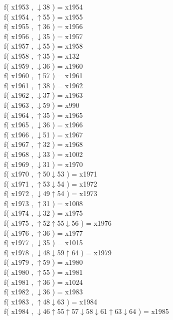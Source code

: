 f( x1953 , $\downarrow$38 ) = x1954 \\
f( x1954 , $\uparrow$55 ) = x1955 \\
f( x1955 , $\uparrow$36 ) = x1956 \\
f( x1956 , $\downarrow$35 ) = x1957 \\
f( x1957 , $\downarrow$55 ) = x1958 \\
f( x1958 , $\uparrow$35 ) = x132 \\
f( x1959 , $\downarrow$36 ) = x1960 \\
f( x1960 , $\uparrow$57 ) = x1961 \\
f( x1961 , $\uparrow$38 ) = x1962 \\
f( x1962 , $\downarrow$37 ) = x1963 \\
f( x1963 , $\downarrow$59 ) = x990 \\
f( x1964 , $\uparrow$35 ) = x1965 \\
f( x1965 , $\downarrow$36 ) = x1966 \\
f( x1966 , $\downarrow$51 ) = x1967 \\
f( x1967 , $\uparrow$32 ) = x1968 \\
f( x1968 , $\downarrow$33 ) = x1002 \\
f( x1969 , $\downarrow$31 ) = x1970 \\
f( x1970 , $\uparrow$50$\downarrow$53 ) = x1971 \\
f( x1971 , $\uparrow$53$\downarrow$54 ) = x1972 \\
f( x1972 , $\downarrow$49$\uparrow$54 ) = x1973 \\
f( x1973 , $\uparrow$31 ) = x1008 \\
f( x1974 , $\downarrow$32 ) = x1975 \\
f( x1975 , $\uparrow$52$\uparrow$55$\downarrow$56 ) = x1976 \\
f( x1976 , $\uparrow$36 ) = x1977 \\
f( x1977 , $\downarrow$35 ) = x1015 \\
f( x1978 , $\downarrow$48$\downarrow$59$\uparrow$64 ) = x1979 \\
f( x1979 , $\uparrow$59 ) = x1980 \\
f( x1980 , $\uparrow$55 ) = x1981 \\
f( x1981 , $\uparrow$36 ) = x1024 \\
f( x1982 , $\downarrow$36 ) = x1983 \\
f( x1983 , $\uparrow$48$\downarrow$63 ) = x1984 \\
f( x1984 , $\downarrow$46$\uparrow$55$\uparrow$57$\downarrow$58$\downarrow$61$\uparrow$63$\downarrow$64 ) = x1985 \\
